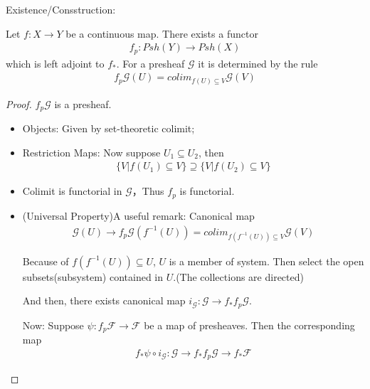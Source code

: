 \documentclass[Total.tex]{subfiles}
\begin{document}
				Existence/Consstruction:
				\begin{lemma}
					Let $f:X\rightarrow Y$ be a continuous map. There exists a functor
					\begin{gather}
						f_p:Psh(Y)\rightarrow Psh(X)
					\end{gather}
					which is left adjoint to $f_*$. For a presheaf $\mathcal{G}$ it is determined by the rule
					\begin{gather*}
						f_p\mathcal{G}(U)=colim_{f(U)\subseteq V} \mathcal{G}(V)
					\end{gather*}
				\end{lemma}
				\begin{proof}
					$f_p\mathcal{G}$ is a presheaf. 
					\begin{itemize}
						\item Objects: Given by set-theoretic colimit;
						\item Restriction Maps: Now suppose $U_1\subseteq U_2$, then 
						\begin{gather*}
							\{V|f(U_1)\subseteq V\}\supseteq \{V|f(U_2)\subseteq V\}
						\end{gather*}
						\item 	Colimit is functorial in $\mathcal{G}$，Thus $f_p$ is functorial. 
						\item 	(Universal Property)A useful remark: Canonical map
						\begin{gather*}
							\mathcal{G}(U)\rightarrow f_p \mathcal{G}(f^{-1}(U))=colim_{f(f^{-1}(U))\subseteq V} \mathcal{G}(V)
						\end{gather*}
						
						Because of $f(f^{-1}(U))\subseteq U$, $U$ is a member of system. Then select the open subsets(subsystem) contained in $U$.(The collections are directed) 
						\begin{center}{\small
								}
						\end{center}
						And then, there exists canonical map $i_\mathcal{G}:\mathcal{G}\rightarrow f_*f_p\mathcal{G}$.
						
						Now: Suppose $\psi:f_p\mathcal{F}\rightarrow \mathcal{F}$ be a map of presheaves. Then the corresponding map
						\begin{gather*}
							f_*\psi\circ i_\mathcal{G}:\mathcal{G}\rightarrow f_*f_p\mathcal{G}\rightarrow f_*\mathcal{F}
						\end{gather*}
						

\end{itemize}
\end{proof}
\end{document}

